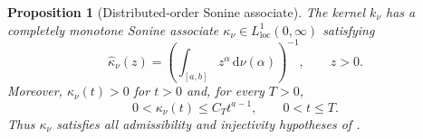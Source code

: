 \documentclass[11pt]{article}
\numberwithin{equation}{section}
\newtheorem{proposition}{Proposition}
\theoremstyle{definition}
\theoremstyle{remark}
\newcommand{\dd}{\,\mathrm d}
\begin{document}
\begin{proposition}[Distributed-order Sonine associate]\label{prop:distributed}
The kernel $k_\nu$ has a completely monotone Sonine associate $\kappa_\nu\in L^1_{\mathrm{loc}}(0,\infty)$ satisfying
\begin{equation}
\widehat\kappa_\nu(z)=\left(\int_{[a,b]}z^\alpha\dd\nu(\alpha)\right)^{-1},
\qquad z>0.
\label{eq:kappahat}
\end{equation}
Moreover, $\kappa_\nu(t)>0$ for $t>0$ and, for every $T>0$,
\begin{equation}
0<\kappa_\nu(t)\le C_Tt^{a-1},
\qquad 0<t\le T.
\label{eq:kappa-bound-distributed}
\end{equation}
Thus $\kappa_\nu$ satisfies all admissibility and injectivity hypotheses of .
\end{proposition}
\end{document}
